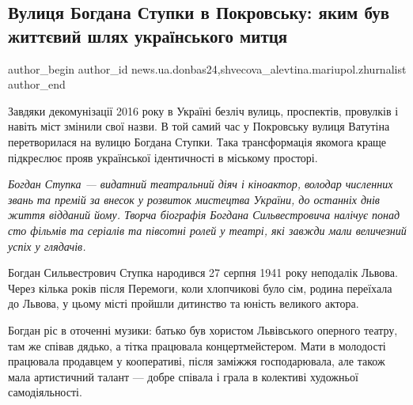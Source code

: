  
 
 
 
 
 
\subsection{Вулиця Богдана Ступки в Покровську: яким був життєвий шлях українського митця}
\label{sec:25_07_2022.stz.news.ua.donbas24.2.vulycja_bogdana_stupky_pokrovsk}
 
\ifcmt
 author_begin
   author_id news.ua.donbas24,shvecova_alevtina.mariupol.zhurnalist
 author_end
\fi


Завдяки декомунізації 2016 року в Україні безліч вулиць, проспектів, провулків
і навіть міст змінили свої назви. В той самий час у Покровську вулиця Ватутіна
перетворилася на вулицю Богдана Ступки. Така трансформація якомога краще
підкреслює прояв української ідентичності в міському просторі.

\begin{leftbar}
\em Богдан Ступка — видатний театральний діяч і кіноактор, володар численних звань
та премій за внесок у розвиток мистецтва України, до останніх днів
життя відданий йому. Творча біографія Богдана Сильвестровича налічує
понад сто фільмів та серіалів та півсотні ролей у театрі, які завжди
мали величезний успіх у глядачів.
\end{leftbar}

Богдан Сильвестрович Ступка народився 27 серпня 1941 року неподалік Львова.
Через кілька років після Перемоги, коли хлопчикові було сім, родина переїхала
до Львова, у цьому місті пройшли дитинство та юність великого актора.

Богдан ріс в оточенні музики: батько був хористом Львівського оперного театру,
там же співав дядько, а тітка працювала концертмейстером. Мати в молодості
працювала продавцем у кооперативі, після заміжжя господарювала, але також мала
артистичний талант — добре співала і грала в колективі художньої
самодіяльності.

